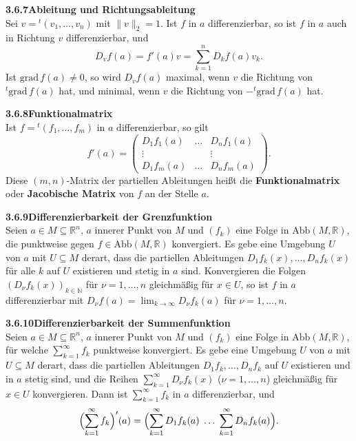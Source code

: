 \documentclass[a4paper,12pt]{article}
\newcommand{\gentry}[3]{%
  \noindent\textbf{#1\quad #2}\nopagebreak\\[0.2em]
  #3\par\smallskip
}
\begin{document}
\gentry{3.6.7}{Ableitung und Richtungsableitung}{%
  Sei $v = {}^t(v_1, \ldots, v_n)$ mit $\|v\|_2 = 1$. Ist $f$ in $a$ differenzierbar,
  so ist $f$ in $a$ auch in Richtung $v$ differenzierbar, und
  \[
    D_v f(a) = f'(a) v = \sum_{k=1}^n D_k f(a) v_k.
  \]
  Ist $\mathrm{grad}\, f(a) \neq 0$, so wird $D_v f(a)$ maximal, wenn $v$ die Richtung
  von ${}^t\mathrm{grad}\, f(a)$ hat, und minimal, wenn $v$ die Richtung von
  $-{}^t\mathrm{grad}\, f(a)$ hat.
}

\gentry{3.6.8}{Funktionalmatrix}{%
  Ist $f = {}^t(f_1, \ldots, f_m)$ in $a$ differenzierbar, so gilt
  \[
    f'(a) = \begin{pmatrix}
      D_1 f_1(a) & \ldots & D_n f_1(a) \\
      \vdots & & \vdots \\
      D_1 f_m(a) & \ldots & D_n f_m(a)
    \end{pmatrix}.
  \]
  Diese $(m, n)$-Matrix der partiellen Ableitungen hei{\ss}t die
  \textbf{Funktionalmatrix} oder \textbf{Jacobische Matrix} von $f$ an der Stelle $a$.
}

\gentry{3.6.9}{Differenzierbarkeit der Grenzfunktion}{%
  Seien $a \in M \subseteq \mathbb{R}^n$, $a$ innerer Punkt von $M$ und $(f_k)$ eine
  Folge in $\mathrm{Abb}(M, \mathbb{R})$, die punktweise gegen $f \in \mathrm{Abb}(M, \mathbb{R})$
  konvergiert. Es gebe eine Umgebung $U$ von $a$ mit $U \subseteq M$ derart, dass
  die partiellen Ableitungen $D_1 f_k(x), \ldots, D_n f_k(x)$ f\"ur alle $k$ auf $U$
  existieren und stetig in $a$ sind. Konvergieren die Folgen $(D_\nu f_k(x))_{k \in \mathbb{N}}$
  f\"ur $\nu = 1, \ldots, n$ gleichm\"a{\ss}ig f\"ur $x \in U$, so ist $f$ in $a$
  differenzierbar mit
  $D_\nu f(a) = \lim_{k \to \infty} D_\nu f_k(a)$ f\"ur $\nu = 1, \ldots, n$.
}

\gentry{3.6.10}{Differenzierbarkeit der Summenfunktion}{%
  Seien $a \in M \subseteq \mathbb{R}^n$, $a$ innerer Punkt von $M$ und $(f_k)$ eine
  Folge in $\mathrm{Abb}(M, \mathbb{R})$, f\"ur welche $\sum_{k=1}^\infty f_k$
  punktweise konvergiert. Es gebe eine Umgebung $U$ von $a$ mit $U \subseteq M$
  derart, dass die partiellen Ableitungen $D_1 f_k, \ldots, D_n f_k$ auf $U$
  existieren und in $a$ stetig sind, und die Reihen
  $\sum_{k=1}^\infty D_\nu f_k(x)$ ($\nu = 1, \ldots, n$) gleichm\"a{\ss}ig f\"ur
  $x \in U$ konvergieren. Dann ist $\sum_{k=1}^\infty f_k$ in $a$ differenzierbar, und
  \[
    \Bigl(\sum_{k=1}^\infty f_k\Bigr)'(a)
    = \Bigl(\sum_{k=1}^\infty D_1 f_k(a)\; \ldots\; \sum_{k=1}^\infty D_n f_k(a)\Bigr).
  \]
}
\end{document}

